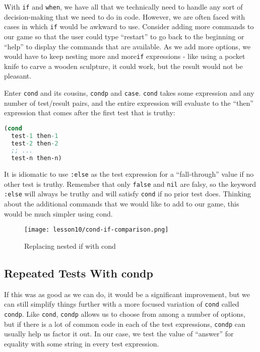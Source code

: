 \documentclass[10pt,twoside,openright]{memoir}
\begin{document}
With \texttt{if} and \texttt{when}, we have all that we technically need
to handle any sort of decision-making that we need to do in code.
However, we are often faced with cases in which \texttt{if} would be
awkward to use. Consider adding more commands to our game so that the
user could type ``restart'' to go back to the beginning or ``help'' to
display the commands that are available. As we add more options, we
would have to keep nesting more and more\texttt{if} expressions - like
using a pocket knife to carve a wooden sculpture, it could work, but the
result would not be pleasant.

Enter \texttt{cond} and its cousins, \texttt{condp} and \texttt{case}.
\texttt{cond} takes some expression and any number of test/result pairs,
and the entire expression will evaluate to the ``then'' expression that
comes after the first test that is truthy:

\begin{lstlisting}[language=Clojure, caption={The structure of \texttt{cond}}]
(cond
  test-1 then-1
  test-2 then-2
  ;; ...
  test-n then-n)
\end{lstlisting}

It is idiomatic to use \texttt{:else} as the test expression for a
``fall-through'' value if no other test is truthy. Remember that only
\texttt{false} and \texttt{nil} are falsy, so the keyword \texttt{:else}
will always be truthy and will satisfy \texttt{cond} if no prior test
does. Thinking about the additional commands that we would like to add
to our game, this would be much simpler using cond.

\begin{figure}[H]
\caption{Replacing nested if with cond}
\centering
\texttt{[image: lesson10/cond-if-comparison.png]}
\end{figure}

\subsection{Repeated Tests With condp}

If this was as good as we can do, it would be a significant improvement,
but we can still simplify things further with a more focused variation
of \texttt{cond} called \texttt{condp}. Like \texttt{cond},
\texttt{condp} allows us to choose from among a number of options, but
if there is a lot of common code in each of the test expressions,
\texttt{condp} can usually help us factor it out. In our case, we test
the value of ``answer'' for equality with some string in every test
expression.
\end{document}
